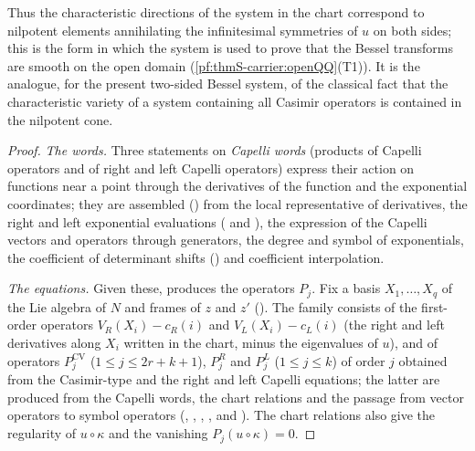 Thus the characteristic directions of the system in the chart correspond to nilpotent elements annihilating the
infinitesimal symmetries of $u$ on both sides; this is the form in which the system is used to prove that the Bessel
transforms are smooth on the open domain (\cref{pf:thmS-carrier:openQQ}(T1)). It is the analogue, for the present
two-sided Bessel system, of the classical fact that the characteristic variety of a system containing all Casimir operators
is contained in the nilpotent cone.

\begin{proof}
\emph{The words.} Three statements on \emph{Capelli words} (products of Capelli operators and of right and left
Capelli operators) express their action on functions near a point through the derivatives of the function and the exponential
coordinates; they are assembled
() from the local representative of
derivatives, the right and left exponential evaluations
( and ),
the expression of the Capelli vectors and operators through generators, the degree and symbol of exponentials, the
coefficient of determinant shifts
() and coefficient
interpolation.

\emph{The equations.} Given these, 
produces the operators $P_j$. Fix a basis $X_1,\dots,X_q$ of the Lie algebra of $N$ and frames of $z$ and $z'$
(). The family consists of the
first-order operators $V_R(X_i)-c_R(i)$ and $V_L(X_i)-c_L(i)$ (the right and left derivatives along $X_i$ written in the chart,
minus the eigenvalues of $u$), and of operators $P^{\mathrm{CV}}_j$ ($1\le j\le2r+k+1$), $P^{R}_j$ and $P^L_j$ ($1\le j\le k$) of
order $j$ obtained from the Casimir-type and the right and left Capelli equations; the latter are produced from the Capelli
words, the chart relations and the passage from vector operators to symbol operators
(, , , , and ).
The chart relations also give the regularity of $u\circ\kappa$ and the vanishing $P_j(u\circ\kappa)=0$.


\end{proof}

